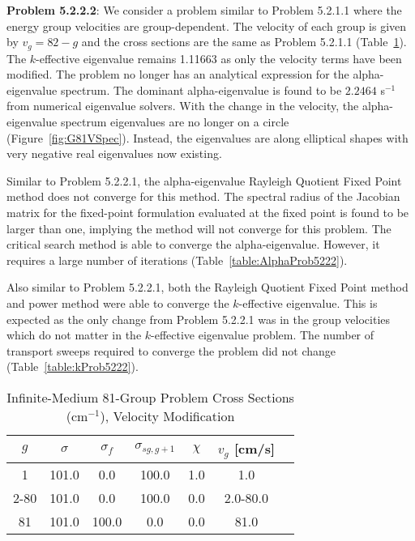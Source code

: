 \textbf{Problem 5.2.2.2}: We consider a problem similar to Problem 5.2.1.1 where the energy group velocities are group-dependent. The velocity of each group is given by $v_{g} = 82 - g$ and the cross sections are the same as Problem 5.2.1.1 (Table~\ref{table:G81v}). The $k$-effective eigenvalue remains 1.11663 as only the velocity terms have been modified. The problem no longer has an analytical expression for the alpha-eigenvalue spectrum. The dominant alpha-eigenvalue is found to be $2.2464$ s$^{-1}$ from numerical eigenvalue solvers. With the change in the velocity, the alpha-eigenvalue spectrum eigenvalues are no longer on a circle (Figure~\ref{fig:G81VSpec}). Instead, the eigenvalues are along elliptical shapes with very negative real eigenvalues now existing. 


Similar to Problem 5.2.2.1, the alpha-eigenvalue Rayleigh Quotient Fixed Point method does not converge for this method. The spectral radius of the Jacobian matrix for the fixed-point formulation evaluated at the fixed point is found to be larger than one, implying the method will not converge for this problem. The critical search method is able to converge the alpha-eigenvalue. However, it requires a large number of iterations (Table~\ref{table:AlphaProb5222}).

Also similar to Problem 5.2.2.1, both the Rayleigh Quotient Fixed Point method and power method were able to converge the $k$-effective eigenvalue. This is expected as the only change from Problem 5.2.2.1 was in the group velocities which do not matter in the $k$-effective eigenvalue problem. The number of transport sweeps required to converge the problem did not change (Table~\ref{table:kProb5222}).

\begin{table}[!htbp]
    \centering
    \caption{Infinite-Medium 81-Group Problem Cross Sections (cm$^{-1}$), Velocity Modification}
\label{table:G81v}
    \begin{tabular}{*7c}
        \toprule
	$g$ & $\sigma$ & $\sigma_{f}$ & $\sigma_{sg,g+1}$ & $\chi$ & $v_{g}$ [cm/s] \\ 
        \midrule
	1 & 101.0 & 0.0 & 100.0 & 1.0 & 1.0 \\
	2-80 & 101.0 & 0.0 & 100.0 & 0.0 & 2.0-80.0 \\
	81 & 101.0 & 100.0 & 0.0 & 0.0 & 81.0 \\
        \bottomrule
    \end{tabular}
\end{table}

